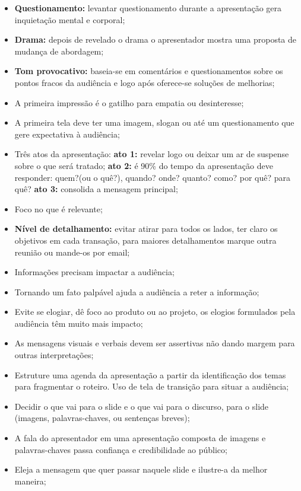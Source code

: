 \begin{itemize}
    \item \textbf{Questionamento:} levantar questionamento durante a apresentação gera inquietação mental e corporal;
    \item \textbf{Drama:} depois de revelado o drama o apresentador mostra uma proposta de mudança de abordagem;
    \item \textbf{Tom provocativo:} baseia-se em comentários e questionamentos sobre os pontos fracos da audiência e logo após oferece-se soluções de melhorias;
    \item A primeira impressão é o gatilho para empatia ou desinteresse;
    \item A primeira tela deve ter uma imagem, slogan ou até um questionamento que gere expectativa à audiência;
    \item Três atos da apresentação: \textbf{ato 1:} revelar logo ou deixar um ar de suspense sobre o que será tratado; \textbf{ato 2:} é 90\% do tempo da apresentação deve responder: quem?(ou o quê?), quando? onde? quanto? como? por quê? para quê? \textbf{ato 3:} consolida a mensagem principal;
    \item Foco no que é relevante; 
    \item \textbf{Nível de detalhamento:} evitar atirar para todos os lados, ter claro os objetivos em cada transação, para maiores detalhamentos marque outra reunião ou mande-os por email;
    \item Informações precisam impactar a audiência;
    \item Tornando um fato palpável ajuda a audiência a reter a informação;
    \item Evite se elogiar, dê foco ao produto ou ao projeto, os elogios formulados pela audiência têm muito mais impacto;
    \item As mensagens visuais e verbais devem ser assertivas não dando margem para outras interpretações;
    \item Estruture uma agenda da apresentação a partir da identificação dos temas para fragmentar o roteiro. Uso de tela de transição para situar a audiência;
    \item Decidir o que vai para o slide e o que vai para o discurso, para o slide (imagens, palavras-chaves, ou sentenças breves);
    \item A fala do apresentador em uma apresentação composta de imagens e palavras-chaves passa confiança e credibilidade ao público;
    \item Eleja a mensagem que quer passar naquele slide e ilustre-a da melhor maneira;

\end{itemize}
